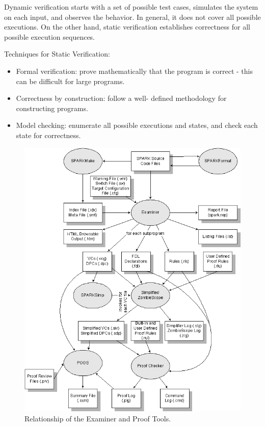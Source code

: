 Dynamic verification starts with a set of possible test cases, simulates the system on each input, and observes the behavior. In general, it does not cover all possible executions. On the other hand, static verification establishes correctness for all possible execution sequences.

Techniques for Static Verification:
\begin{itemize}
	\item Formal verification: prove mathematically that the program is correct - this can be difficult for large programs.
	\item Correctness by construction: follow a well- defined methodology for constructing programs.
	\item Model checking: enumerate all possible executions and states, and check each state for correctness.
\end{itemize}

\begin{figure}[ht]%
    \begin{center}
    	\includegraphics[height=0.6\textheight]{figures/spark-tools.png}    	
    \end{center}
    \caption{Relationship of the Examiner and Proof Tools\protect\footnotemark.}
    \label{figure:spark-tools}
\end{figure}

